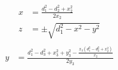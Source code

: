 \documentclass[10pt]{beamer}
\begin{document}
\begin{frame}
    \begin{columns}
        \begin{equation}
            \begin{split}
                x &= \frac{d_1^2 - d_2^2 + x_2^2}{2x_2}\\
                z &= \pm \sqrt{d_1^2 - x^2 - y^2} \\
            \end{split}
            \label{eqn:simplified_multilateration_x}
        \end{equation}
        \begin{equation}
            \begin{split}
                y &= \frac{d_1^2 - d_3^2 + x_3^2 + y_3^2 - \frac{x_3(d_1^2 - d_2^2 + x_2^2)}{x_2}}{2y_3}
            \end{split}
            \label{eqn:simplified_multilateration_z}
        \end{equation}
    \end{columns}
\end{frame}
\end{document}
